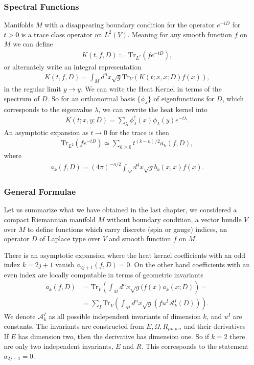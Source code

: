 \subsubsection{Spectral Functions}
Manifolds $M$ with a disappearing boundary condition for the operator $e^{-tD}$ for $t>0$ is a
trace class operator on $L^2(V)$. Meaning for any smooth function $f$ on $M$
we can define
\begin{align}
    K(t,f,D) := \text{Tr}_{L^2}(fe^{-tD}),
\end{align}
or alternately write an integral representation
\begin{align}
    K(t, f, D) = \int_M d^n x \sqrt{g} \text{Tr}_V(K(t;x,x;D)f(x)),
\end{align}
in the regular limit $y\rightarrow y$. We can write the Heat Kernel in terms
of the spectrum of $D$. So for an orthonormal basis $\{\phi_\lambda\}$ of
eigenfunctions for $D$, which corresponds to the eigenvalue $\lambda$, we
can rewrite the heat kernel into
\begin{align}
    K(t;x,y;D) = \sum_\lambda \phi^\dagger_\lambda(x)
    \phi_\lambda(y)e^{-t\lambda}.
\end{align}
An asymptotic expansion as $t \rightarrow 0$ for the trace is then
\begin{align}
    \text{Tr}_{L^2}(fe^{-tD}) \simeq \sum_{k\geq 0}t^{(k-n)/2}a_k(f,D),
\end{align}
where
\begin{align}
    a_k(f,D) = (4\pi)^{-n/2} \int_M d^4x \sqrt{g} b_k(x,x) f(x).
\end{align}
\subsubsection{General Formulae}
Let us summarize what we have obtained in the last chapter, we considered a
compact Riemannian manifold $M$ without boundary condition, a vector bundle
$V$ over $M$ to define functions which carry discrete (spin or gauge)
indices, an operator $D$ of Laplace type over $V$ and smooth function $f$ on
$M$.

There is an asymptotic expansion where the heat kernel coefficients with an
odd index $k=2j+1$ vanish $a_{2j+1}(f,D) = 0$. On the other hand coefficients
with an even index are locally computable in terms of geometric invariants
\begin{align}
    a_k(f,D) &= \text{Tr}_V\left(\int_M d^n x\sqrt{g}(f(x)a_k(x;D)\right)
    =\nonumber\\
    &=\sum_I \text{Tr}_V\left(\int_M d^nx \sqrt{g}(fu^I
    \mathcal{A}^I_k(D))\right).
\end{align}
We denote $\mathcal{A}^I_k$ as all possible independent invariants of
dimension $k$, and $u^I$ are constants. The invariants are constructed from
$E, \Omega, R_{\mu\nu\varrho\sigma}$ and their derivatives If $E$ has
dimension two, then the derivative has dimension one. So if $k=2$ there are
only two independent invariants, $E$ and $R$. This corresponds to the
statement $a_{2j+1}=0$.

